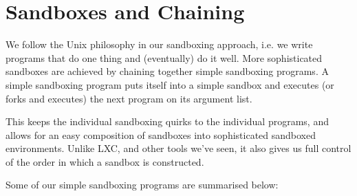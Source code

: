 
\section{Sandboxes and Chaining}

We follow the Unix philosophy\cite{salus-1994} in our sandboxing approach, i.e.
we write programs that do one thing and (eventually) do it well. More
sophisticated sandboxes are achieved by chaining together simple sandboxing
programs. A simple sandboxing program puts itself into a simple sandbox and
executes (or forks and executes) the next program on its argument list.

This keeps the individual sandboxing quirks to the individual programs, and
allows for an easy composition of sandboxes into sophisticated sandboxed
environments. Unlike LXC, and other tools we've seen, it also gives us full
control of the order in which a sandbox is constructed.

Some of our simple sandboxing programs are summarised below:

